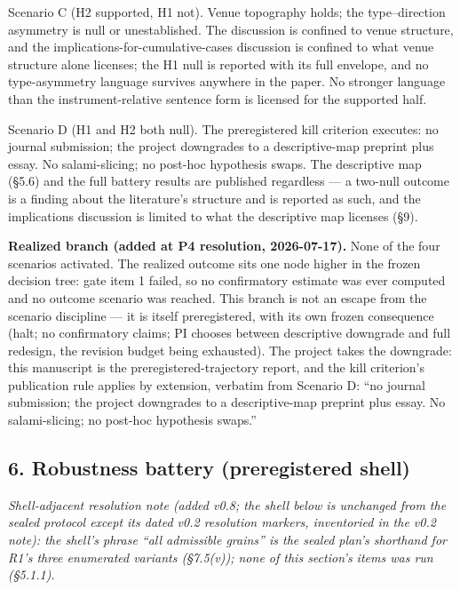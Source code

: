 Scenario C (H2 supported, H1 not). Venue topography holds; the type--direction asymmetry is null or unestablished. The discussion is confined to venue structure, and the implications-for-cumulative-cases discussion is confined to what venue structure alone licenses; the H1 null is reported with its full envelope, and no type-asymmetry language survives anywhere in the paper. No stronger language than the instrument-relative sentence form is licensed for the supported half.

Scenario D (H1 and H2 both null). The preregistered kill criterion executes: no journal submission; the project downgrades to a descriptive-map preprint plus essay. No salami-slicing; no post-hoc hypothesis swaps. The descriptive map (\S{}5.6) and the full battery results are published regardless --- a two-null outcome is a finding about the literature's structure and is reported as such, and the implications discussion is limited to what the descriptive map licenses (\S{}9).

\textbf{Realized branch (added at P4 resolution, 2026-07-17).} None of the four scenarios activated. The realized outcome sits one node higher in the frozen decision tree: gate item 1 failed, so no confirmatory estimate was ever computed and no outcome scenario was reached. This branch is not an escape from the scenario discipline --- it is itself preregistered, with its own frozen consequence (halt; no confirmatory claims; PI chooses between descriptive downgrade and full redesign, the revision budget being exhausted). The project takes the downgrade: this manuscript is the preregistered-trajectory report, and the kill criterion's publication rule applies by extension, verbatim from Scenario D: ``no journal submission; the project downgrades to a descriptive-map preprint plus essay. No salami-slicing; no post-hoc hypothesis swaps.''

\subsection{6. Robustness battery (preregistered shell)}\label{robustness-battery-preregistered-shell}

\emph{Shell-adjacent resolution note (added v0.8; the shell below is unchanged from the sealed protocol except its dated v0.2 resolution markers, inventoried in the v0.2 note): the shell's phrase ``all admissible grains'' is the sealed plan's shorthand for R1's three enumerated variants (\S{}7.5(v)); none of this section's items was run (\S{}5.1.1).}

